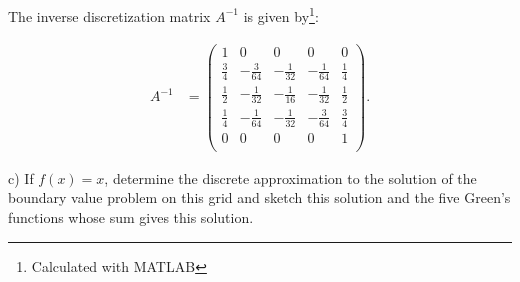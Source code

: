 \begin{solution}\ \\\\
    The inverse discretization matrix $A^{-1}$ is given by\footnote{Calculated with MATLAB}:

    \begingroup
    \renewcommand*{\arraystretch}{1.5}
    \begin{align*}
        A^{-1} &=
        \begin{pmatrix}
                      1 &             0 &             0  &             0 &           0 \\
            \frac{3}{4} & -\frac{3}{64} & -\frac{1}{32}  & -\frac{1}{64} & \frac{1}{4} \\
            \frac{1}{2} & -\frac{1}{32} & -\frac{1}{16}  & -\frac{1}{32} & \frac{1}{2} \\
            \frac{1}{4} & -\frac{1}{64} & -\frac{1}{32}  & -\frac{3}{64} & \frac{3}{4} \\
                      0 &             0 &             0  &             0 &           1 \\
        \end{pmatrix}.
    \end{align*}
    \endgroup
\end{solution}

\pagebreak
c) If $f(x) = x$, determine the discrete approximation to the solution of the boundary value problem on this grid and
   sketch this solution and the five Green's functions whose sum gives this solution.


